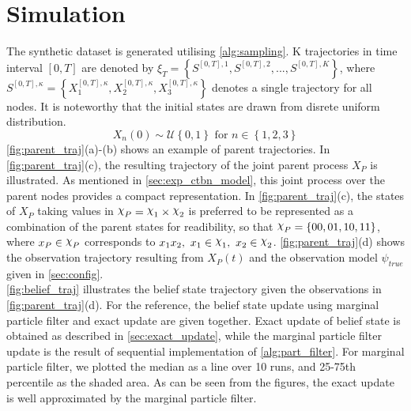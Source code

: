 \section{Simulation}
\label{sec:simulation}
The synthetic dataset is generated utilising \cref{alg:sampling}. K trajectories in time interval $ [0, T] $ are denoted by $ \xi_T = \left\lbrace S^{[0,T], 1}, S^{[0,T], 2}, ..., S^{[0,T], K} \right\rbrace  $, where $ S^{[0,T],\kappa} = \left\lbrace X_1^{[0,T],\kappa} , X_2^{[0,T],\kappa}, X_3^{[0,T],\kappa}\right\rbrace $ denotes a single trajectory for all nodes. It is noteworthy that the initial states are drawn from disrete uniform distribution.
\begin{equation}
X_n(0) \sim \mathcal{U} \left\lbrace 0, 1\right\rbrace  \text{ for } n \in \left\lbrace 1,2,3\right\rbrace 
\end{equation}
\autoref{fig:parent_traj}(a)-(b) shows an example of parent trajectories. In \autoref{fig:parent_traj}(c), the resulting trajectory of the joint parent process $ X_P $ is illustrated. As mentioned in \cref{sec:exp_ctbn_model}, this joint process over the parent nodes provides a compact representation. In \autoref{fig:parent_traj}(c), the states of $ X_P $ taking values in $ \rchi_P = \rchi_1 \times \rchi_2 $ is preferred to be represented as a combination of the parent states for readibility, so that $ \rchi_P = \left\lbrace 00, 01, 10, 11\right\rbrace  $, where $ x_P \in \rchi_P $ corresponds to $ x_1x_2,\ x_1\in \rchi_1,\  x_2\in \rchi_2 $. \autoref{fig:parent_traj}(d) shows the observation trajectory resulting from $ X_P(t) $ and the observation model $ \psi_{true} $ given in \cref{sec:config}. \\
\autoref{fig:belief_traj} illustrates the belief state trajectory given the observations in \autoref{fig:parent_traj}(d). For the reference, the belief state update using marginal particle filter and exact update are given together. Exact update of belief state is obtained as described in \cref{sec:exact_update}, while the marginal particle filter update is the result of sequential implementation of \cref{alg:part_filter}. For marginal particle filter, we plotted the median as a line over 10 runs, and 25-75th percentile as the shaded area. As can be seen from the figures, the exact update is well approximated by the marginal particle filter.
